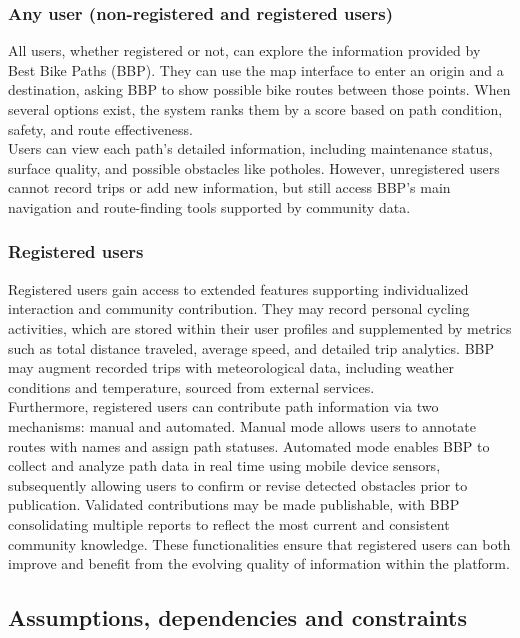 \subsubsection{Any user (non-registered and registered users)}

All users, whether registered or not, can explore the information provided by Best Bike Paths (BBP). They can use the map interface to enter an origin and a destination, asking BBP to show possible bike routes between those points. When several options exist, the system ranks them by a score based on path condition, safety, and route effectiveness. \\
Users can view each path’s detailed information, including maintenance status, surface quality, and possible obstacles like potholes. However, unregistered users cannot record trips or add new information, but still access BBP’s main navigation and route-finding tools supported by community data.

\subsubsection{Registered users}

Registered users gain access to extended features supporting individualized interaction and community contribution. They may record personal cycling activities, which are stored within their user profiles and supplemented by metrics such as total distance traveled, average speed, and detailed trip analytics. BBP may augment recorded trips with meteorological data, including weather conditions and temperature, sourced from external services. \\
Furthermore, registered users can contribute path information via two mechanisms: manual and automated. Manual mode allows users to annotate routes with names and assign path statuses. Automated mode enables BBP to collect and analyze path data in real time using mobile device sensors, subsequently allowing users to confirm or revise detected obstacles prior to publication. Validated contributions may be made publishable, with BBP consolidating multiple reports to reflect the most current and consistent community knowledge. These functionalities ensure that registered users can both improve and benefit from the evolving quality of information within the platform.

\subsection{Assumptions, dependencies and constraints}

